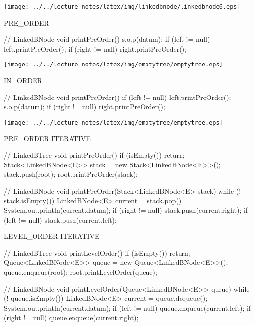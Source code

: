 \documentclass[a4paper, 10pt]{article}
\begin{document}
\begin{minipage}{0.6\linewidth}
  \begin{center}
\texttt{[image: ../../lecture-notes/latex/img/linkedbnode/linkedbnode6.eps]}
\begin{multicols}{2}
\begin{blackboard}
      PRE_ORDER

// LinkedBNode
void printPreOrder() {
  s.o.p(datum);
  if (left != null) {
    left.printPreOrder();
  }
  if (right != null) {
    right.printPreOrder();
  }
}
\end{blackboard}
\columnbreak
\texttt{[image: ../../lecture-notes/latex/img/emptytree/emptytree.eps]}
\end{multicols}
\begin{multicols}{2}
\begin{blackboard}
      IN_ORDER

// LinkedBNode
void printPreOrder() {
  if (left != null) {
    left.printPreOrder();
  }
  s.o.p(datum);
  if (right != null) {
    right.printPreOrder();
  }
}
\end{blackboard}
\columnbreak
\texttt{[image: ../../lecture-notes/latex/img/emptytree/emptytree.eps]}
\end{multicols}
\end{center}
\end{minipage}


\begin{minipage}{0.48\linewidth}
\begin{blackboard}
      PRE_ORDER ITERATIVE

// LinkedBTree
void printPreOrder() {
  if (isEmpty()) {
    return;
  }
  Stack<LinkedBNode<E>> stack =
                   new Stack<LinkedBNode<E>>();
  stack.push(root);
  root.printPreOrder(stack);
}

// LinkedBNode
void printPreOrder(Stack<LinkedBNode<E> stack) {
  while (! stack.isEmpty()) {
    LinkedBNode<E> current = stack.pop();
    System.out.println(current.datum);
    if (right != null) {
      stack.push(current.right);
    }
    if (left != null) {
      stack.push(current.left);
    }
  }
}
\end{blackboard}
\end{minipage}
\begin{minipage}{0.48\linewidth}
\begin{blackboard}
      LEVEL_ORDER ITERATIVE

// LinkedBTree
void printLevelOrder() {
  if (isEmpty()) {
    return;
  }
  Queue<LinkedBNode<E>> queue =
                   new Queue<LinkedBNode<E>>();
  queue.enqueue(root);
  root.printLevelOrder(queue);
}

// LinkedBNode
void printLevelOrder(Queue<LinkedBNode<E>> queue) {
  while (! queue.isEmpty()) {
    LinkedBNode<E> current = queue.dequeue();
    System.out.println(current.datum);
    if (left != null) {
      queue.enqueue(current.left);
    }
    if (right != null) {
      queue.enqueue(current.right);
    }
  }
}
\end{blackboard}
\end{minipage}
\end{document}
